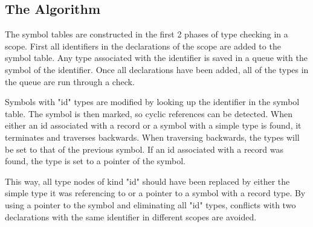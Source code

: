 \documentclass{article}
\begin{document}
\subsection{The Algorithm}


The symbol tables are constructed in the first 2 phases of type checking in a scope. First all identifiers in the declarations of the scope are added to the symbol table. Any type associated with the identifier is saved in a queue with the symbol of the identifier. Once all declarations have been added, all of the types in the queue are run through a check. 

Symbols with "id" types are modified by looking up the identifier in the symbol table. The symbol is then marked, so cyclic references can be detected. When either an id associated with a record or a symbol with a simple type is found, it terminates and traverses backwards. When traversing backwards, the types will be set to that of the previous symbol. If an id associated with a record was found, the type is set to a pointer of the symbol.

This way, all type nodes of kind "id" should have been replaced by either the simple type it was referencing to or a pointer to a symbol with a record type. By using a pointer to the symbol and eliminating all "id" types, conflicts with two declarations with the same identifier in different scopes are avoided.

\newpage
\end{document}

